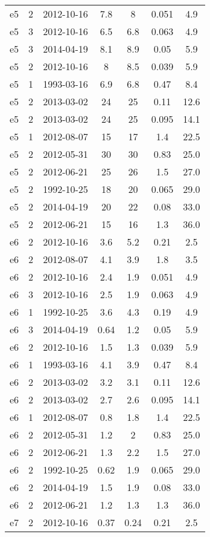 \begin{table*}[htp]
\begin{tabular}{ccccccc}
e5 & 2 & 2012-10-16 & 7.8 & 8 & 0.051 & 4.9 \\
e5 & 3 & 2012-10-16 & 6.5 & 6.8 & 0.063 & 4.9 \\
e5 & 3 & 2014-04-19 & 8.1 & 8.9 & 0.05 & 5.9 \\
e5 & 2 & 2012-10-16 & 8 & 8.5 & 0.039 & 5.9 \\
e5 & 1 & 1993-03-16 & 6.9 & 6.8 & 0.47 & 8.4 \\
e5 & 2 & 2013-03-02 & 24 & 25 & 0.11 & 12.6 \\
e5 & 2 & 2013-03-02 & 24 & 25 & 0.095 & 14.1 \\
e5 & 1 & 2012-08-07 & 15 & 17 & 1.4 & 22.5 \\
e5 & 2 & 2012-05-31 & 30 & 30 & 0.83 & 25.0 \\
e5 & 2 & 2012-06-21 & 25 & 26 & 1.5 & 27.0 \\
e5 & 2 & 1992-10-25 & 18 & 20 & 0.065 & 29.0 \\
e5 & 2 & 2014-04-19 & 20 & 22 & 0.08 & 33.0 \\
e5 & 2 & 2012-06-21 & 15 & 16 & 1.3 & 36.0 \\
e6 & 2 & 2012-10-16 & 3.6 & 5.2 & 0.21 & 2.5 \\
e6 & 2 & 2012-08-07 & 4.1 & 3.9 & 1.8 & 3.5 \\
e6 & 2 & 2012-10-16 & 2.4 & 1.9 & 0.051 & 4.9 \\
e6 & 3 & 2012-10-16 & 2.5 & 1.9 & 0.063 & 4.9 \\
e6 & 1 & 1992-10-25 & 3.6 & 4.3 & 0.19 & 4.9 \\
e6 & 3 & 2014-04-19 & 0.64 & 1.2 & 0.05 & 5.9 \\
e6 & 2 & 2012-10-16 & 1.5 & 1.3 & 0.039 & 5.9 \\
e6 & 1 & 1993-03-16 & 4.1 & 3.9 & 0.47 & 8.4 \\
e6 & 2 & 2013-03-02 & 3.2 & 3.1 & 0.11 & 12.6 \\
e6 & 2 & 2013-03-02 & 2.7 & 2.6 & 0.095 & 14.1 \\
e6 & 1 & 2012-08-07 & 0.8 & 1.8 & 1.4 & 22.5 \\
e6 & 2 & 2012-05-31 & 1.2 & 2 & 0.83 & 25.0 \\
e6 & 2 & 2012-06-21 & 1.3 & 2.2 & 1.5 & 27.0 \\
e6 & 2 & 1992-10-25 & 0.62 & 1.9 & 0.065 & 29.0 \\
e6 & 2 & 2014-04-19 & 1.5 & 1.9 & 0.08 & 33.0 \\
e6 & 2 & 2012-06-21 & 1.2 & 1.3 & 1.3 & 36.0 \\
e7 & 2 & 2012-10-16 & 0.37 & 0.24 & 0.21 & 2.5 \\

\end{tabular}
\end{table*}
